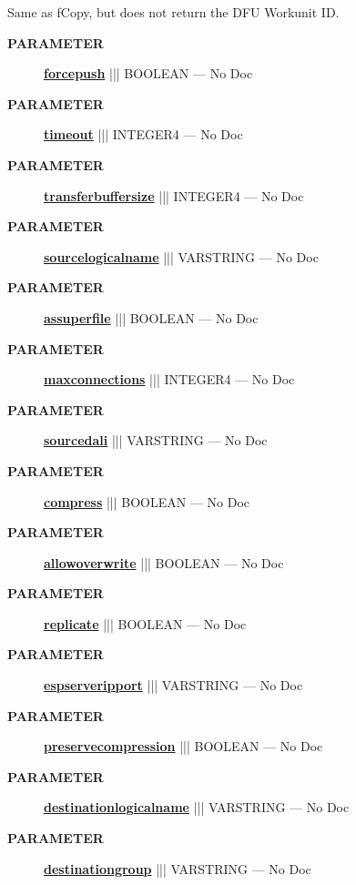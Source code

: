 \par





Same as fCopy, but does not return the DFU Workunit ID.






\par
\begin{description}
\item [\colorbox{tagtype}{\color{white} \textbf{\textsf{PARAMETER}}}] \textbf{\underline{forcepush}} ||| BOOLEAN --- No Doc
\item [\colorbox{tagtype}{\color{white} \textbf{\textsf{PARAMETER}}}] \textbf{\underline{timeout}} ||| INTEGER4 --- No Doc
\item [\colorbox{tagtype}{\color{white} \textbf{\textsf{PARAMETER}}}] \textbf{\underline{transferbuffersize}} ||| INTEGER4 --- No Doc
\item [\colorbox{tagtype}{\color{white} \textbf{\textsf{PARAMETER}}}] \textbf{\underline{sourcelogicalname}} ||| VARSTRING --- No Doc
\item [\colorbox{tagtype}{\color{white} \textbf{\textsf{PARAMETER}}}] \textbf{\underline{assuperfile}} ||| BOOLEAN --- No Doc
\item [\colorbox{tagtype}{\color{white} \textbf{\textsf{PARAMETER}}}] \textbf{\underline{maxconnections}} ||| INTEGER4 --- No Doc
\item [\colorbox{tagtype}{\color{white} \textbf{\textsf{PARAMETER}}}] \textbf{\underline{sourcedali}} ||| VARSTRING --- No Doc
\item [\colorbox{tagtype}{\color{white} \textbf{\textsf{PARAMETER}}}] \textbf{\underline{compress}} ||| BOOLEAN --- No Doc
\item [\colorbox{tagtype}{\color{white} \textbf{\textsf{PARAMETER}}}] \textbf{\underline{allowoverwrite}} ||| BOOLEAN --- No Doc
\item [\colorbox{tagtype}{\color{white} \textbf{\textsf{PARAMETER}}}] \textbf{\underline{replicate}} ||| BOOLEAN --- No Doc
\item [\colorbox{tagtype}{\color{white} \textbf{\textsf{PARAMETER}}}] \textbf{\underline{espserveripport}} ||| VARSTRING --- No Doc
\item [\colorbox{tagtype}{\color{white} \textbf{\textsf{PARAMETER}}}] \textbf{\underline{preservecompression}} ||| BOOLEAN --- No Doc
\item [\colorbox{tagtype}{\color{white} \textbf{\textsf{PARAMETER}}}] \textbf{\underline{destinationlogicalname}} ||| VARSTRING --- No Doc
\item [\colorbox{tagtype}{\color{white} \textbf{\textsf{PARAMETER}}}] \textbf{\underline{destinationgroup}} ||| VARSTRING --- No Doc
\end{description}







